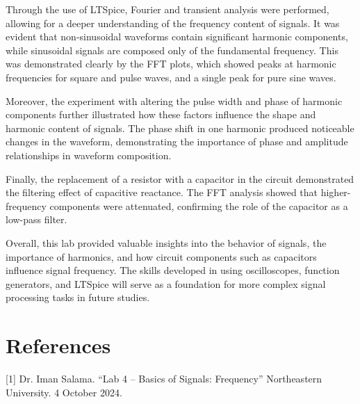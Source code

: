 \documentclass{article}
\begin{document}
Through the use of LTSpice, Fourier and transient analysis were performed, allowing for a deeper understanding of the 
frequency content of signals. It was evident that non-sinusoidal waveforms contain significant harmonic components, 
while sinusoidal signals are composed only of the fundamental frequency. This was demonstrated clearly by the FFT plots, 
which showed peaks at harmonic frequencies for square and pulse waves, and a single peak for pure sine waves.
\newline

Moreover, the experiment with altering the pulse width and phase of harmonic components further illustrated how these 
factors influence the shape and harmonic content of signals. The phase shift in one harmonic produced noticeable changes 
in the waveform, demonstrating the importance of phase and amplitude relationships in waveform composition.
\newline

Finally, the replacement of a resistor with a capacitor in the circuit demonstrated the filtering effect of capacitive 
reactance. The FFT analysis showed that higher-frequency components were attenuated, confirming the role of the capacitor 
as a low-pass filter.
\newline

Overall, this lab provided valuable insights into the behavior of signals, the importance of harmonics, and how circuit 
components such as capacitors influence signal frequency. The skills developed in using oscilloscopes, function generators, 
and LTSpice will serve as a foundation for more complex signal processing tasks in future studies.
\newline

\section{References}
 [1] Dr. Iman Salama. “Lab 4 – Basics of Signals: Frequency” Northeastern University. 4 October 2024.
\end{document}
